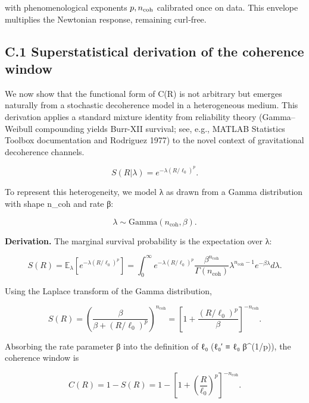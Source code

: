 \documentclass[11pt,a4paper]{article}
\begin{document}
with phenomenological exponents $p,n_{\rm coh}$ calibrated once on data. This envelope multiplies the Newtonian response, remaining curl‑free.


\subsection{C.1 Superstatistical derivation of the coherence window}


We now show that the functional form of C(R) is not arbitrary but emerges naturally from a stochastic decoherence model in a heterogeneous medium. This derivation applies a standard mixture identity from reliability theory (Gamma–Weibull compounding yields Burr-XII survival; see, e.g., MATLAB Statistics Toolbox documentation and Rodriguez 1977) to the novel context of gravitational decoherence channels.



\begin{equation}
S(R|\lambda) = e^{-\lambda(R/\ell_0)^p}.
\end{equation}


To represent this heterogeneity, we model λ as drawn from a Gamma distribution with shape n\_coh and rate β:


\begin{equation}
\lambda \sim \mathrm{Gamma}(n_{\mathrm{coh}}, \beta).
\end{equation}


\textbf{Derivation.} The marginal survival probability is the expectation over λ:


\begin{equation}
S(R) = \mathbb{E}_{\lambda}\left[e^{-\lambda(R/\ell_0)^p}\right] = \int_0^\infty e^{-\lambda(R/\ell_0)^p} \frac{\beta^{n_{\mathrm{coh}}}}{\Gamma(n_{\mathrm{coh}})} \lambda^{n_{\mathrm{coh}}-1} e^{-\beta\lambda} d\lambda.
\end{equation}


Using the Laplace transform of the Gamma distribution,


\begin{equation}
S(R) = \left(\frac{\beta}{\beta + (R/\ell_0)^p}\right)^{n_{\mathrm{coh}}} = \left[1 + \frac{(R/\ell_0)^p}{\beta}\right]^{-n_{\mathrm{coh}}}.
\end{equation}


Absorbing the rate parameter β into the definition of ℓ₀ (ℓ₀′ ≡ ℓ₀ β^(1/p)), the coherence window is


\begin{equation}
C(R) = 1 - S(R) = 1 - \left[1 + \left(\frac{R}{\ell_0}\right)^p\right]^{-n_{\mathrm{coh}}}.
\end{equation}
\end{document}
